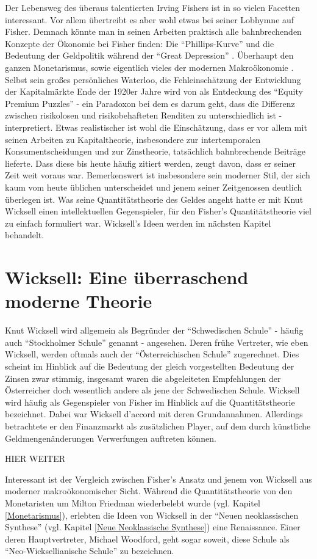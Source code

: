 Der Lebensweg des überaus talentierten Irving Fishers ist in so vielen Facetten interessant. Vor allem \textcite{Dimand2005} übertreibt es aber wohl etwas bei seiner Lobhymne auf Fisher. Demnach könnte man in seinen Arbeiten praktisch alle bahnbrechenden Konzepte der Ökonomie bei Fisher finden: Die "`Phillips-Kurve"' und die Bedeutung der Geldpolitik während der "`Great Depression"' \parencite[S. 7]{Dimand2005}. Überhaupt den ganzen Monetarismus, sowie eigentlich vieles der modernen Makroökonomie  \parencite[S. 10]{Dimand2005}. Selbst sein großes persönliches Waterloo, die Fehleinschätzung der Entwicklung der Kapitalmärkte Ende der 1920er Jahre wird von \textcite[S. 9]{Dimand2005} als Entdeckung des "`Equity Premium Puzzles"' - ein Paradoxon bei dem es darum geht, dass die Differenz zwischen risikolosen und risikobehafteten Renditen zu unterschiedlich ist - interpretiert. Etwas realistischer ist wohl die Einschätzung, dass er vor allem mit seinen Arbeiten zu Kapitaltheorie, insbesondere zur intertemporalen Konsumentscheidungen und zur Zinstheorie, tatsächlich bahnbrechende Beiträge lieferte. Dass diese bis heute häufig zitiert werden, zeugt davon, dass er seiner Zeit weit voraus war. Bemerkenswert ist insbesondere sein moderner Stil, der sich kaum vom heute üblichen unterscheidet und jenem seiner Zeitgenossen deutlich überlegen ist. Was seine Quantitätstheorie des Geldes angeht hatte er mit Knut Wicksell einen intellektuellen Gegenspieler, für den Fisher's Quantitätstheorie viel zu einfach formuliert war. Wicksell's Ideen werden im nächsten Kapitel behandelt.

\section{Wicksell: Eine überraschend moderne Theorie}

Knut Wicksell wird allgemein als Begründer der "`Schwedischen Schule"' - häufig auch "`Stockholmer Schule"' genannt - angesehen. Deren frühe Vertreter, wie eben Wicksell, werden oftmals auch der "`Österreichischen Schule"' zugerechnet. Dies scheint im Hinblick auf die Bedeutung der gleich vorgestellten Bedeutung der Zinsen zwar stimmig, insgesamt waren die abgeleiteten Empfehlungen der Österreicher doch wesentlich andere als jene der Schwedischen Schule.
Wicksell wird häufig als Gegenspieler von Fisher im Hinblick auf die Quantitätstheorie bezeichnet. Dabei war Wicksell d'accord mit deren Grundannahmen. Allerdings betrachtete er den Finanzmarkt als zusätzlichen Player, auf dem durch künstliche Geldmengenänderungen Verwerfungen auftreten können.

HIER WEITER

Interessant ist der Vergleich zwischen Fisher's Ansatz und jenem von Wicksell aus moderner makroökonomischer Sicht. Während die Quantitätstheorie von den Monetaristen um Milton Friedman wiederbelebt wurde (vgl. Kapitel \ref{Monetarismus}), erlebten die Ideen von Wicksell in der "`Neuen neoklassischen Synthese"' (vgl. Kapitel \ref{Neue Neoklassische Synthese}) eine Renaissance. Einer deren Hauptvertreter, Michael Woodford, geht sogar soweit, diese Schule als "`Neo-Wicksellianische Schule"' zu bezeichnen. 





